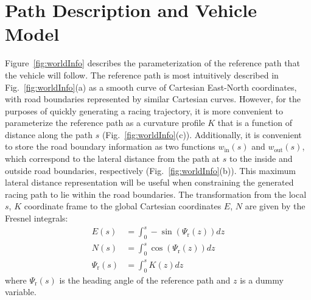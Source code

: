 \documentclass[twocolumn,10pt]{asme2ej}
\begin{document}
\section{Path Description and Vehicle Model}
\label{sec:PATH}
Figure~\ref{fig:worldInfo} describes the parameterization of the reference path that the vehicle will follow. The reference path is most intuitively described in Fig.~\ref{fig:worldInfo}(a) as a 
smooth curve of Cartesian East-North coordinates, with road boundaries represented by similar Cartesian curves. However, for the purposes of quickly generating
a racing trajectory, it is more convenient to parameterize the reference path as a curvature profile $K$ that is a function of distance along the path $s$ (Fig.~\ref{fig:worldInfo}(c)). Additionally, it is 
convenient to store the road boundary information as two functions $w_\mathrm{in}(s)$ and $w_\mathrm{out}(s)$, which correspond to the lateral distance from the path at $s$
 to the inside and outside road boundaries, respectively (Fig.~\ref{fig:worldInfo}(b)). This maximum lateral distance representation will be useful when constraining the generated racing path to lie within the road 
 boundaries. The transformation from the local $s$, $K$ coordinate frame to 
the global Cartesian coordinates $E$, $N$ are given by the Fresnel integrals:
\begin{subequations}
\label{eq:fresnel}
\begin{align}
	E(s) &= \int_0^s  -\sin(\Psi_\mathrm{r}(z)) dz \\
	N(s) &= \int_0^s   \cos(\Psi_\mathrm{r}(z)) dz \\
	\Psi_\mathrm{r}(s) &= \int_0^s K(z) dz \label{eq:balls}
\end{align}
\end{subequations}
where $\Psi_\mathrm{r}(s)$ is the heading angle of the reference path and $z$ is a dummy variable. 
\end{document}
